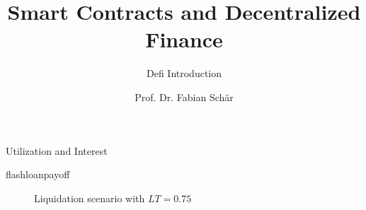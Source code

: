 \documentclass[]{beamer}
\title{Smart Contracts and Decentralized Finance}
\subtitle{Defi Introduction}
\author{Prof. Dr. Fabian Schär}
\institute{University of Basel}
\begin{document}
\thispagestyle{empty}
\begin{frame}[noframenumbering]
	\titlepage
\end{frame}

\begin{frame}{Utilization and Interest}




\end{frame}

\begin{frame}{flashloanpayoff}

\begin{figure}[t]
	\centering
	\begin{tikzpicture}[scale=0.5, every node/.style={scale=0.8}]
		
	\end{tikzpicture}
	\caption{Liquidation scenario with $LT = 0.75$}
\end{figure}



\end{frame}
\end{document}
